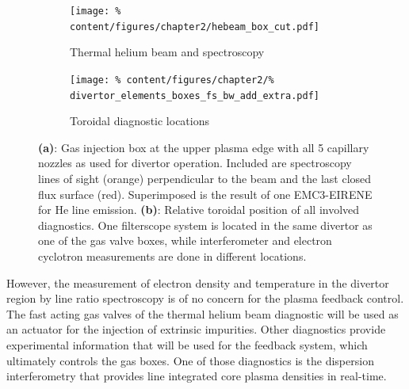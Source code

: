         \begin{figure}[t]%
            \centering%
            \begin{subfigure}{0.42\textwidth}%
                \texttt{[image: \%
                    content/figures/chapter2/hebeam\_box\_cut.pdf]}%
                \caption{Thermal helium beam and spectroscopy%
                }\label{fig:hebeam}%
            \end{subfigure}%
            \hfill%
            \begin{subfigure}{0.55\textwidth}%
                \texttt{[image: \%
                    content/figures/chapter2/\%
                    divertor\_elements\_boxes\_fs\_bw\_add\_extra.pdf]}%
                \caption{Toroidal diagnostic locations}\label{fig:positions}%
            \end{subfigure}%
            \caption{\textbf{(a)}: Gas injection box at the upper plasma edge with all 5 capillary nozzles as used for divertor operation. Included are spectroscopy lines of sight (orange) perpendicular to the beam and the last closed flux surface (red). Superimposed is the result of one EMC3-EIRENE for He line emission\cite{Barbui2016}. \textbf{(b)}: Relative toroidal position of all involved diagnostics. One filterscope system is located in the same divertor as one of the gas valve boxes, while interferometer and electron cyclotron measurements are done in different locations.}\label{fig:hebeam_pos}%
        \end{figure}%
%
        \newline%
        However, the measurement of electron density and temperature in the divertor region by line ratio spectroscopy is of no concern for the plasma feedback control. The fast acting gas valves of the thermal helium beam diagnostic will be used as an actuator for the injection of extrinsic impurities. Other diagnostics provide experimental information that will be used for the feedback system, which ultimately controls the gas boxes. One of those diagnostics is the dispersion interferometry that provides line integrated core plasma densities in real-time.
%
